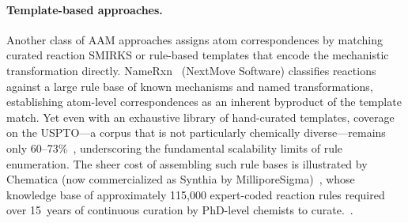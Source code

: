 \documentclass[12pt]{article}
\begin{document}
\paragraph{Template-based approaches.}
Another class of AAM approaches assigns atom correspondences by matching
curated reaction SMIRKS or rule-based templates that encode the
mechanistic transformation directly.  NameRxn~\cite{NameRxn} (NextMove
Software) classifies reactions against a large rule base of known
mechanisms and named transformations, establishing atom-level
correspondences as an inherent byproduct of the template match.
Yet even with an exhaustive library of hand-curated templates, coverage
on the USPTO---a corpus that is not particularly chemically diverse---remains only 60--73\%~\cite{Lagerstedt2021},
underscoring the fundamental scalability limits of rule enumeration.
The sheer cost of assembling such rule bases is illustrated by Chematica
(now commercialized as Synthia by MilliporeSigma)~\cite{Szymkuc2016},
whose knowledge base of approximately 115{,}000 expert-coded reaction rules
required over 15~years of continuous curation by PhD-level chemists
to curate.~\cite{Klucznik2018}.
\end{document}
